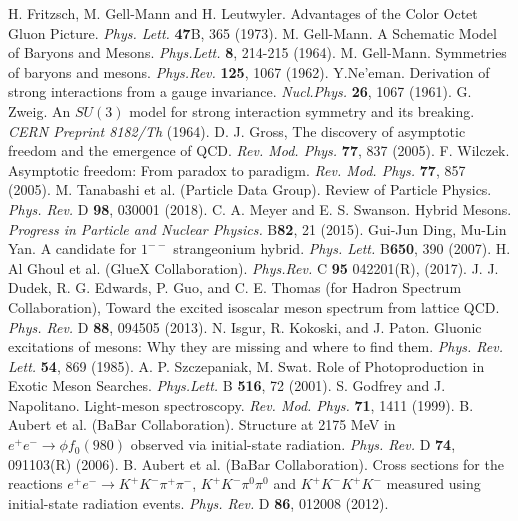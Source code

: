 \begin{thebibliography}{ABC}	
     H. Fritzsch, M. Gell-Mann and H. Leutwyler. Advantages of the Color Octet Gluon Picture. \emph{Phys. Lett.} \textbf{47}B, 365 (1973).
     M. Gell-Mann. A Schematic Model of Baryons and Mesons. \emph{Phys.Lett.} \textbf{8}, 214-215 (1964).
     M. Gell-Mann. Symmetries of baryons and mesons. \emph{Phys.Rev.} \textbf{125}, 1067 (1962).
     Y.Ne'eman. Derivation of strong interactions from a gauge invariance. \emph{Nucl.Phys.} \textbf{26}, 1067 (1961).
     G. Zweig. An $SU(3)$ model for strong interaction symmetry and its breaking. \emph{CERN Preprint 8182/Th} (1964).
     D. J. Gross, The discovery of asymptotic freedom and the emergence of QCD. \emph{Rev. Mod. Phys.} \textbf{77}, 837 (2005).
     F. Wilczek. Asymptotic freedom: From paradox to paradigm. \emph{Rev. Mod. Phys.} \textbf{77}, 857 (2005).
     M. Tanabashi et al. (Particle Data Group). Review of Particle Physics. \emph{Phys. Rev.} D \textbf{98}, 030001 (2018).
     C. A. Meyer and E. S. Swanson. Hybrid Mesons. \emph{Progress in Particle and Nuclear Physics.} B\textbf{82}, 21 (2015).
     Gui-Jun Ding, Mu-Lin Yan. A candidate for $1^{--}$ strangeonium hybrid. \emph{Phys. Lett.} B\textbf{650}, 390 (2007).
     H. Al Ghoul et al. (GlueX Collaboration). \emph{Phys.Rev.} C \textbf{95} 042201(R), (2017).
     J. J. Dudek, R. G. Edwards, P. Guo, and C. E. Thomas (for Hadron Spectrum Collaboration), Toward the excited isoscalar meson spectrum from lattice QCD. \emph{Phys. Rev.} D \textbf{88}, 094505 (2013).
     N. Isgur, R. Kokoski, and J. Paton. Gluonic excitations of mesons: Why they are missing and where to find them. \emph{Phys. Rev. Lett.} \textbf{54}, 869 (1985).
     A. P. Szczepaniak, M. Swat. Role of Photoproduction in Exotic Meson Searches. \emph{Phys.Lett.} B \textbf{516}, 72 (2001).
     S. Godfrey and J. Napolitano. Light-meson spectroscopy. \emph{Rev. Mod. Phys.} \textbf{71}, 1411 (1999).
     B. Aubert et al. (BaBar Collaboration). Structure at 2175 MeV in $e^+e^- \rightarrow \phi f_0(980)$ observed via initial-state radiation. \emph{Phys. Rev.} D \textbf{74}, 091103(R) (2006).
     B. Aubert et al. (BaBar Collaboration). Cross sections for the reactions $e^{+}e^{-} \rightarrow K^+K^{-}\pi^{+}\pi^{-}$, $K^{+}K^{-}\pi^{0}\pi^{0}$ and $K^{+}K^{-}K^{+}K^{-}$ measured using initial-state radiation events. \emph{Phys. Rev.} D \textbf{86}, 012008 (2012).

\end{thebibliography}
